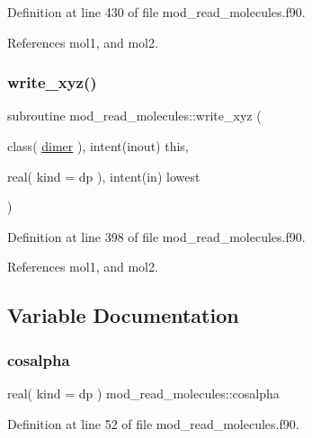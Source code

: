 Definition at line 430 of file mod\+\_\+read\+\_\+molecules.\+f90.



References mol1, and mol2.

\mbox{\label{namespacemod__read__molecules_ab4af6b28d9b99eb519efb212a5f02f58}} 
\subsubsection{\texorpdfstring{write\+\_\+xyz()}{write\_xyz()}}
{\footnotesize\ttfamily subroutine mod\+\_\+read\+\_\+molecules\+::write\+\_\+xyz (\begin{DoxyParamCaption}\item[{class( \hyperlink{structmod__read__molecules_1_1dimer}{dimer} ), intent(inout)}]{this,  }\item[{real( kind = dp ), intent(in)}]{lowest }\end{DoxyParamCaption})}



Definition at line 398 of file mod\+\_\+read\+\_\+molecules.\+f90.



References mol1, and mol2.



\subsection{Variable Documentation}
\mbox{\label{namespacemod__read__molecules_ac0e3265d01367c7b422240b7ebc4be85}} 
\subsubsection{\texorpdfstring{cosalpha}{cosalpha}}
{\footnotesize\ttfamily real( kind = dp ) mod\+\_\+read\+\_\+molecules\+::cosalpha}



Definition at line 52 of file mod\+\_\+read\+\_\+molecules.\+f90.




